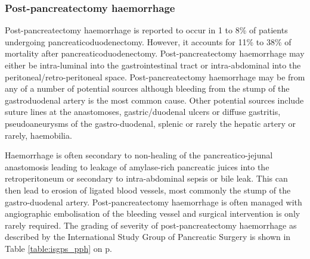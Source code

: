 \subsubsection{Post-pancreatectomy haemorrhage}
\label{sec:ch_intro_PPH}
Post-pancreatectomy haemorrhage is reported to occur in 1 to 8\% of patients undergoing pancreaticoduodenectomy. However, it accounts for 11\% to 38\% of mortality after pancreaticoduodenectomy. Post-pancreatectomy haemorrhage may either be intra-luminal into the gastrointestinal tract or intra-abdominal into the peritoneal/retro-peritoneal space. Post-pancreatectomy haemorrhage may be from any of a number of potential sources although bleeding from the stump of the gastroduodenal artery is the most common cause. Other potential sources include suture lines at the anastomoses, gastric/duodenal ulcers or diffuse gastritis, pseudoaneurysms of the gastro-duodenal, splenic or rarely the hepatic artery or rarely, haemobilia.

Haemorrhage is often secondary to non-healing of the pancreatico-jejunal anastomosis leading to leakage of amylase-rich pancreatic juices into the retroperitoneum or secondary to intra-abdominal sepsis or bile leak.\parencite{tien_risk_2005, koukoutsis_haemorrhage_2006, choi_delayed_2004, balladur_bleeding_1996} This can then lead to erosion of ligated blood vessels, most commonly the stump of the gastro-duodenal artery. Post-pancreatectomy haemorrhage is often managed with angiographic embolisation of the bleeding vessel and surgical intervention is only rarely required. The grading of severity of post-pancreatectomy haemorrhage as described by the International Study Group of Pancreatic Surgery\parencite{wente_postpancreatectomy_2007} is shown in Table \ref{table:isgps_pph} on p\pageref{table:isgps_pph}.


